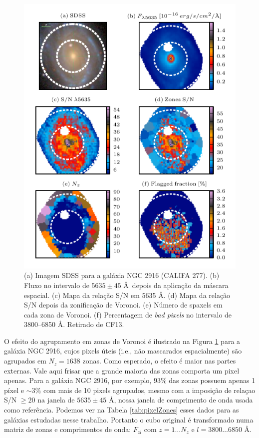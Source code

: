 \begin{figure}
	\includegraphics[width=1.0\textwidth]{figuras/figCF13fig1.pdf}
    \caption[Máscara espacial, zonas de Voronoi e flags para a galáxia NGC 2916 (CALIFA 277).]
    {(a) Imagem SDSS para a galáxia NGC 2916 (CALIFA 277). (b) Fluxo no intervalo de $5635 \pm 45$ \AA\ depois da
    aplicação da máscara espacial. (c) Mapa da relação S/N em 5635 \AA. (d) Mapa da relação S/N depois da zonificação de
    Voronoi. (e) Número de spaxels em cada zona de Voronoi. (f) Percentagem de {\em bad pixels} no intervalo
    de 3800--6850 \AA. Retirado de CF13.}
   	\label{fig:zonesfig1CF13}
\end{figure}

O efeito do agrupamento em zonas de Voronoi é ilustrado na Figura \ref{fig:zonesfig1CF13} para a galáxia NGC 2916, cujos
pixels úteis (i.e., não mascarados espacialmente) são agrupados em $N_z = 1638$ zonas. Como esperado, o efeito é maior
nas partes externas. Vale aqui frisar que a grande maioria das zonas comporta um pixel apenas. Para a galáxia NGC 2916,
por exemplo, $93\%$ das zonas possuem apenas 1 píxel e $\sim 3\%$ com mais de 10 pixels agrupados, mesmo com a imposição
de relaçao S/N $\ge 20$ na janela de $5635 \pm 45$ \AA, nossa janela de comprimento de onda usada como referência.
Podemos ver na Tabela \ref{tab:pixelZones} esses dados para as galáxias estudadas nesse trabalho. Portanto o cubo
original é transformado numa matriz de zonas e comprimentos de onda: $F_{zl}$ com $z = 1 \ldots N_z$ e $l = 3800 \ldots
6850$ \AA.


